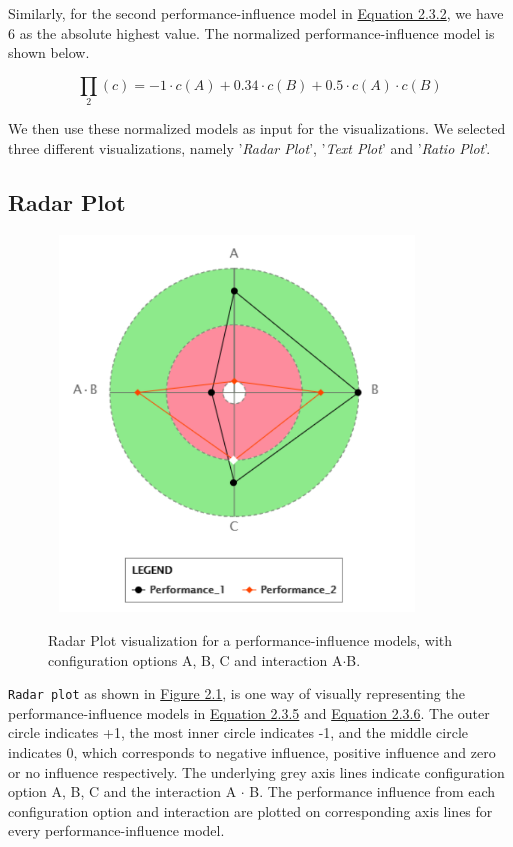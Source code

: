 Similarly, for the second performance-influence model in \hyperref[eq:2.3.2]{Equation 2.3.2}, we have 6 as the absolute highest value. The normalized performance-influence model is shown below.

\begin{equation*}
  \prod_2{(c)} = - 1 \cdot c(A) + 0.34 \cdot c(B) + 0.5 \cdot  c(A) \cdot c(B)
   \tag{2.3.6}\label{eq:2.3.6}
\end{equation*}

We then use these normalized models as input for the visualizations. We selected three different visualizations, namely '\textit{Radar Plot}', '\textit{Text Plot}' and '\textit{Ratio Plot}'. 

\subsection{Radar Plot}

\begin{figure}[ht]
\centering %
\label{radaPlot}
\includegraphics[width=10cm,height=10cm,keepaspectratio,]{pics/radar_plot.pdf}
\caption[Radar Plot]{Radar Plot visualization for a performance-influence models, with configuration options A, B, C and interaction A$\cdot$B.}
\end{figure}

\texttt{Radar plot} as shown in \hyperref[radaPlot]{Figure 2.1}, is one way of visually representing the performance-influence models in \hyperref[eq:2.3.5]{Equation 2.3.5} and \hyperref[eq:2.3.6]{Equation 2.3.6}. The outer circle indicates +1, the most inner circle indicates -1, and the middle circle indicates 0, which corresponds to negative influence, positive influence and zero or no influence respectively. The underlying grey axis lines indicate configuration option A, B, C and the interaction A $\cdot$ B. The performance influence from each configuration option and interaction are plotted on corresponding axis lines for every performance-influence model.

